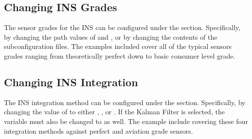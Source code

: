 \documentclass[letterpaper,10pt,english]{sphinxmanual}
\begin{document}
\subsection{Changing INS Grades}
\label{\detokenize{usage/tutorials:changing-ins-grades}}
\sphinxAtStartPar
The sensor grades for the INS can be configured under the  section. Specifically, by changing the
path values of  and , or by changing the contents of the
sub\sphinxhyphen{}configuration files. The examples included cover all of the typical sensors grades ranging from
theoretically perfect down to basic consumer level grade.

\begin{sphinxVerbatim}[commandchars=\\\{\}]
\end{sphinxVerbatim}


\subsection{Changing INS Integration}
\label{\detokenize{usage/tutorials:changing-ins-integration}}
\sphinxAtStartPar
The INS integration method can be configured under the  section. Specifically, by changing the value of
 to either , ,  or . If the Kalman Filter is
selected, the variable  must also be changed to  as well. The example include
covering these four integration methods against perfect and aviation grade sensors.
\end{document}
